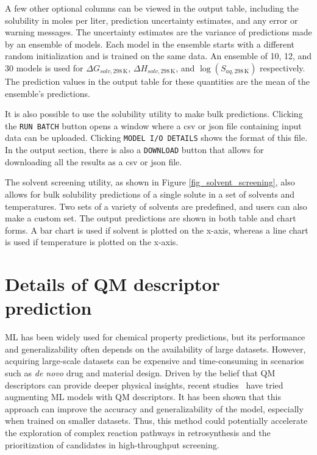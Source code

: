 \documentclass[pdflatex,sn-mathphys-num]{sn-jnl}%
\theoremstyle{thmstyleone}%
\theoremstyle{thmstyletwo}%
\theoremstyle{thmstylethree}%
\begin{document}
A few other optional columns can be viewed in the output table, including the solubility in moles per liter, prediction uncertainty estimates, and any error or warning messages. The uncertainty estimates are the variance of predictions made by an ensemble of models. Each model in the ensemble starts with a different random initialization and is trained on the same data. An ensemble of 10, 12, and 30 models is used for $\Delta G_{solv, 298\, \mathrm{K}}$, $\Delta H_{solv, 298\, \mathrm{K}}$, and $\log\left(S_{aq, 298\, \mathrm{K}}\right)$ respectively. The prediction values in the output table for these quantities are the mean of the ensemble's predictions. 

It is also possible to use the solubility utility to make bulk predictions. Clicking the \texttt{RUN BATCH} button opens a window where a csv or json file containing input data can be uploaded. Clicking \texttt{MODEL I/O DETAILS} shows the format of this file. In the output section, there is also a \texttt{DOWNLOAD} button that allows for downloading all the results as a csv or json file. 

The solvent screening utility, as shown in Figure \ref{fig_solvent_screening}, also allows for bulk solubility predictions of a single solute in a set of solvents and temperatures. Two sets of a variety of solvents are predefined, and users can also make a custom set. The output predictions are shown in both table and chart forms. A bar chart is used if solvent is plotted on the x-axis, whereas a line chart is used if temperature is plotted on the x-axis. 

\section{Details of QM descriptor prediction}\label{results_qm}

ML has been widely used for chemical property predictions, but its performance and generalizability often depends on the availability of large datasets. However, acquiring large-scale datasets can be expensive and time-consuming in scenarios such as \emph{de novo} drug and material design. Driven by the belief that QM descriptors can provide deeper physical insights, recent studies~\citep{guan_regio-selectivity_2021,li_when_2024,stuyver2022quantum} have tried augmenting ML models with QM descriptors. It has been shown that this approach can improve the accuracy and generalizability of the model, especially when trained on smaller datasets. Thus, this method could potentially accelerate the exploration of complex reaction pathways in retrosynthesis and the prioritization of candidates in high-throughput screening.
\end{document}
